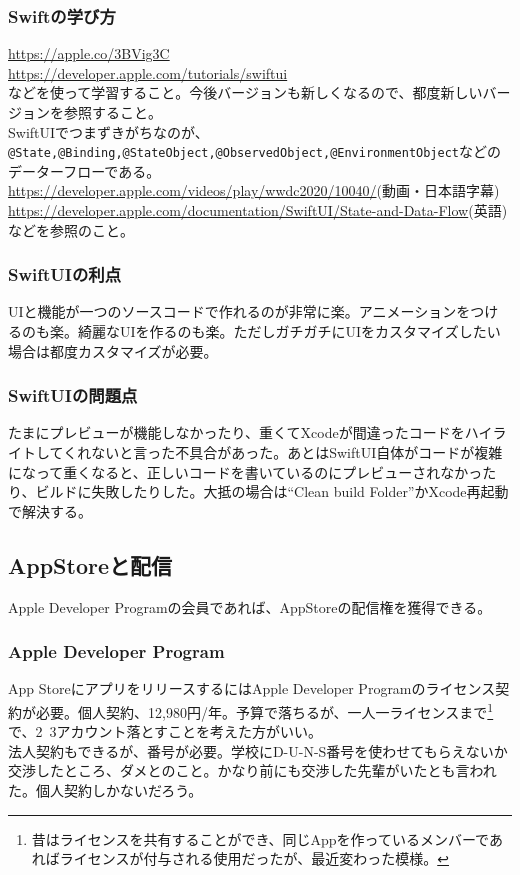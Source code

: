\documentclass[dvipdfmx,jb5]{jarticle}
\begin{document}
  \subsubsection{Swiftの学び方}
  \url{https://apple.co/3BVig3C}\\
  \url{https://developer.apple.com/tutorials/swiftui}\\
  などを使って学習すること。今後バージョンも新しくなるので、都度新しいバージョンを参照すること。\\
  SwiftUIでつまずきがちなのが、\texttt{@State,@Binding,@StateObject,@ObservedObject,@EnvironmentObject}などのデーターフローである。\\
  \url{https://developer.apple.com/videos/play/wwdc2020/10040/}(動画・日本語字幕)\\
  \url{https://developer.apple.com/documentation/SwiftUI/State-and-Data-Flow}(英語)\\
  などを参照のこと。
  \subsubsection{SwiftUIの利点}
  UIと機能が一つのソースコードで作れるのが非常に楽。アニメーションをつけるのも楽。綺麗なUIを作るのも楽。ただしガチガチにUIをカスタマイズしたい場合は都度カスタマイズが必要。
  \subsubsection{SwiftUIの問題点}
   たまにプレビューが機能しなかったり、重くてXcodeが間違ったコードをハイライトしてくれないと言った不具合があった。あとはSwiftUI自体がコードが複雑になって重くなると、正しいコードを書いているのにプレビューされなかったり、ビルドに失敗したりした。大抵の場合は``Clean build Folder''かXcode再起動で解決する。\\
  \subsection{AppStoreと配信}
   Apple Developer Programの会員であれば、AppStoreの配信権を獲得できる。
  \subsubsection{Apple Developer Program}
  App StoreにアプリをリリースするにはApple Developer Programのライセンス契約が必要。個人契約、12,980円/年。予算で落ちるが、一人一ライセンスまで\footnote{昔はライセンスを共有することができ、同じAppを作っているメンバーであればライセンスが付与される使用だったが、最近変わった模様。}で、2~3アカウント落とすことを考えた方がいい。\\
  法人契約もできるが、番号が必要。学校にD-U-N-S番号を使わせてもらえないか交渉したところ、ダメとのこと。かなり前にも交渉した先輩がいたとも言われた。個人契約しかないだろう。
\end{document}
